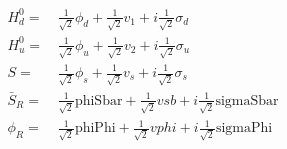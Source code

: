 \begin{align} 
H_d^0 = & \, \frac{1}{\sqrt{2}} \phi_{d}  + \frac{1}{\sqrt{2}} v_1  + i \frac{1}{\sqrt{2}} \sigma_{d} \\ 
H_u^0 = & \, \frac{1}{\sqrt{2}} \phi_{u}  + \frac{1}{\sqrt{2}} v_2  + i \frac{1}{\sqrt{2}} \sigma_{u} \\ 
S = & \, \frac{1}{\sqrt{2}} \phi_s  + \frac{1}{\sqrt{2}} v_s  + i \frac{1}{\sqrt{2}} \sigma_s \\ 
\bar{S}_R = & \, \frac{1}{\sqrt{2}} \text{phiSbar}  + \frac{1}{\sqrt{2}} vsb  + i \frac{1}{\sqrt{2}} \text{sigmaSbar} \\ 
\phi_R = & \, \frac{1}{\sqrt{2}} \text{phiPhi}  + \frac{1}{\sqrt{2}} vphi  + i \frac{1}{\sqrt{2}} \text{sigmaPhi} 
\end{align} 
